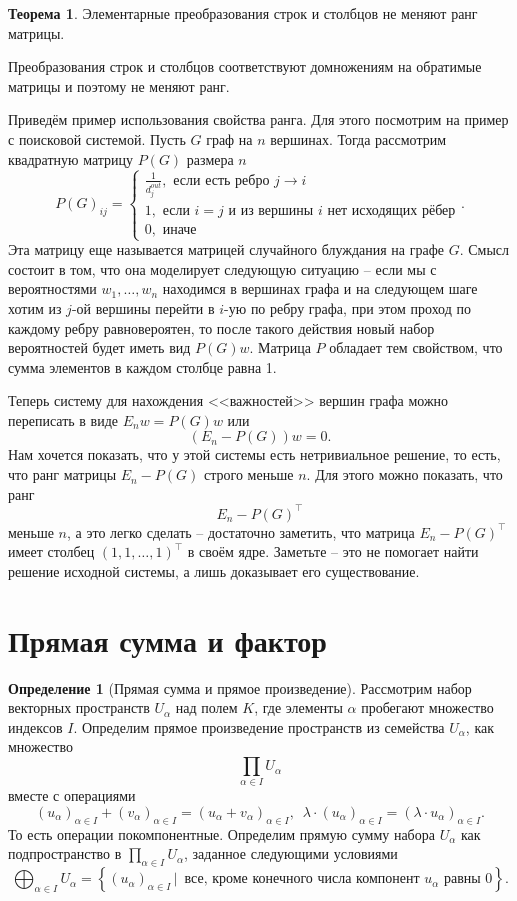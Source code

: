 \documentclass[10pt,a4paper,oneside]{book}
\theoremstyle{definition}
\newtheorem*{defn}{Определение}
\newtheorem{thm}{Теорема}
\def\thrm{\begin{thm}}
\def\ethrm{\end{thm}}
\def\dfn{\begin{defn}}
\def\edfn{\end{defn}}
\begin{document}
\thrm
Элементарные преобразования строк и столбцов не меняют ранг матрицы.

\ethrm
\proof Преобразования строк и столбцов соответствуют домножениям на обратимые матрицы и поэтому не меняют ранг.
\endproof

Приведём пример использования свойства ранга. Для этого посмотрим на пример с поисковой системой. Пусть $G$ граф на $n$ вершинах. Тогда рассмотрим квадратную матрицу $P(G)$ размера $n$
$$P(G)_{ij}= \begin{cases} \frac{1}{d_j^{out}}, \text{ если есть ребро $j \to i$} \\
1, \text{ если $i=j$ и из вершины $i$ нет исходящих рёбер}\\
0, \text{ иначе }
\end{cases}.$$
Эта матрицу еще называется матрицей случайного блуждания на графе $G$. Смысл состоит в том, что она моделирует следующую ситуацию -- если мы с вероятностями $w_1,\dots,w_n$ находимся в вершинах графа и на следующем шаге хотим из $j$-ой вершины перейти в $i$-ую по ребру графа, при этом проход по каждому ребру равновероятен, то после такого действия новый набор вероятностей будет иметь вид $P(G)w$. Матрица $P$ обладает тем свойством, что сумма элементов в каждом столбце равна 1.

Теперь систему для нахождения <<важностей>> вершин графа можно переписать в виде $E_n w= P(G)w$ или
$$(E_n - P(G))w=0.$$
Нам хочется показать, что у этой системы есть нетривиальное решение, то есть, что ранг матрицы $E_n- P(G)$ строго меньше $n$. Для этого можно показать, что ранг
$$E_n - P(G)^{\top}$$
меньше $n$, а это легко сделать -- достаточно заметить, что матрица $E_n - P(G)^{\top}$  имеет столбец $(1,1,\dots, 1)^{\top}$ в своём ядре. Заметьте -- это не помогает найти решение исходной системы, а лишь доказывает его существование.






\section{Прямая сумма и фактор}

\dfn[Прямая сумма и прямое произведение] Рассмотрим набор векторных пространств $U_{\alpha}$ над полем $K$,  где элементы $\alpha$ пробегают множество индексов $I$. Определим прямое произведение пространств из семейства $U_{\alpha}$, как множество
$$\prod_{\alpha \in I} U_{\alpha}$$
вместе с операциями $$(u_{\alpha})_{\alpha\in I}+ (v_{\alpha})_{\alpha\in I}=(u_{\alpha}+v_{\alpha})_{\alpha\in I},\,\,\, \lambda \cdot (u_{\alpha})_{\alpha\in I}= (\lambda \cdot u_{\alpha})_{\alpha\in I}.$$
То есть операции покомпонентные. Определим прямую сумму набора $U_{\alpha}$ как подпространство в $\prod_{\alpha \in I} U_{\alpha}$, заданное следующими условиями
$$\bigoplus_{\alpha \in I } U_{\alpha}=\left\{ (u_{\alpha})_{\alpha \in I} \,|\, \text{ все, кроме конечного числа компонент $u_{\alpha}$ равны 0}\right\}.$$
\edfn
\end{document}
